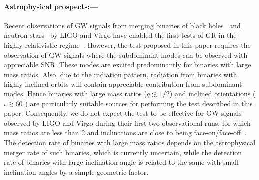 \documentclass[prl,preprintnumbers,twocolumn,eqsecnum,floatfix,a4paper,nofootinbib,superscriptaddress]{revtex4}
\begin{document}
\paragraph{Astrophysical prospects:---} 
Recent observations of GW signals from merging binaries of black holes~\cite{gw150914, gw151226, LSC_2016O1results, gw170104, gw170608, gw170814} and neutron stars~\cite{gw170817} by LIGO and Virgo have enabled the first tests of GR in the highly relativistic regime~\cite{LSC_2016grtests, LSC_2016O1results, gw170104, gw170608, gw170814}. However, the test proposed in this paper requires the observation of GW signals where the subdominant modes can be observed with appreciable SNR. These modes are excited predominantly for binaries with large mass ratios. Also, due to the radiation pattern, radiation from binaries with highly inclined orbits will contain appreciable contribution from subdominant modes. Hence binaries with large mass ratios ($q \lesssim 1/2$) and inclined orientations ($\iota \gtrsim 60^{\circ}$) are particularly suitable sources for performing the test described in this paper. Consequently, we do not expect the test to be effective for GW signals observed by LIGO and Virgo during their first two observational runs, for which mass ratios are less than 2 and inclinations are close to being face-on/face-off~\cite{LSC_2016O1results,gw170104,gw170608,gw170814}. The detection rate of binaries with large mass ratios depends on the astrophysical merger rate of such binaries, which is currently uncertain, while the detection rate of binaries with large inclination angle is related to the same with small inclination angles by a simple geometric factor. 
\end{document}
